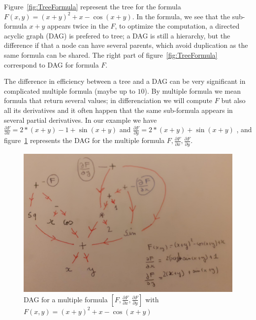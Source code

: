 Figure~\ref{fig:TreeFormula} represent the tree for the formula $F(x,y) = (x+y)^2 +x - \cos(x+y)$. 
In the formula, we see that the sub-formula $x+y$ appears twice in the $F$, to optimize the computation,
a directed acyclic graph (DAG) is prefered to tree;  a DAG  is still a hierarchy, but the difference
if that a node can have several parents, which avoid duplication as the same formula can be shared.
The right part of figure~\ref{fig:TreeFormula} correspond to DAG for formula $F$.


The difference in efficiency between a tree and a DAG can be very significant 
in complicated multiple formula  (maybe up to $10$). By multiple formula we mean formula that return several values;
in differenciation we will compute $F$ but also all its derivatives and it often happen that
the same sub-formula appears in several partial derivatives.  In our example we
have $\frac{\partial F}{\partial x} = 2*(x+y) -1 + \sin(x+y)$ and $\frac{\partial F}{\partial y} = 2*(x+y) + \sin(x+y)$ ,
and figure~\ref{fig:DagMultiformula} represents the DAG for the multiple formula
$F,\frac{\partial F}{\partial x},\frac{\partial F}{\partial y}$.



\begin{figure}
\centering
\includegraphics[width=12cm]{Programmer/ImagesProg/DAG.jpg}
\caption{DAG for a multiple formula  $[F,\frac{\partial F}{\partial x}, \frac{\partial F}{\partial y}]$ with $F(x,y) = (x+y)^2 +x - \cos(x+y)$}
\label{fig:DagMultiformula}
\end{figure}



